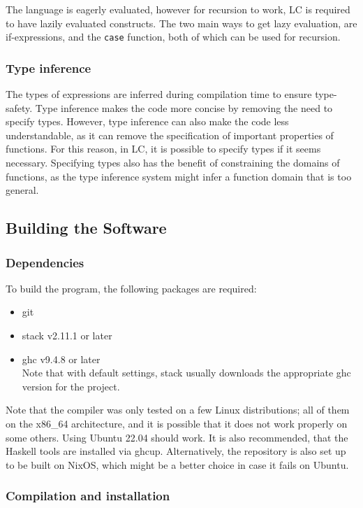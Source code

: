 \documentclass[12pt]{article}
\begin{document}
The language is eagerly evaluated, however for recursion to work, LC is required
to have lazily evaluated constructs. The two main ways to get lazy evaluation,
are if-expressions, and the \verb$case$ function, both of which can be used for
recursion.

\subsubsection{Type inference}

The types of expressions are inferred during compilation time to ensure
type-safety. Type inference makes the code more concise by removing the need to
specify types. However, type inference can also make the code less
understandable, as it can remove the specification of important properties of
functions. For this reason, in LC, it is possible to specify types if it seems
necessary. Specifying types also has the benefit of constraining the domains of
functions, as the type inference system might infer a function domain that is
too general.

\subsection{Building the Software}
\subsubsection{Dependencies}

To build the program, the following packages are required:
\begin{itemize}
    \item git
    \item stack v2.11.1 or later
    \item ghc v9.4.8 or later \\ Note that with default settings, stack usually
        downloads the appropriate ghc version for the project.
\end{itemize}
Note that the compiler was only tested on a few Linux distributions; all of them
on the x86\_64 architecture, and it is possible that it does not work properly
on some others. Using Ubuntu 22.04 should work. It is also recommended, that the
Haskell tools are installed via ghcup. Alternatively, the repository is also set
up to be built on NixOS, which might be a better choice in case it fails on
Ubuntu.

\subsubsection{Compilation and installation}
\end{document}
